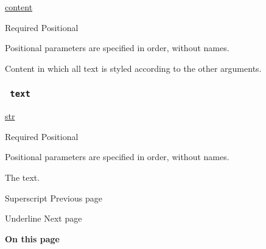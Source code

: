 \href{/docs/reference/foundations/content/}{content}

{Required} {{ Positional }}

\label{parameters-body-positional-tooltip}
Positional parameters are specified in order, without names.

Content in which all text is styled according to the other arguments.

\subsubsection{\texorpdfstring{\texttt{\ text\ }}{ text }}\label{parameters-text}

\href{/docs/reference/foundations/str/}{str}

{Required} {{ Positional }}

\label{parameters-text-positional-tooltip}
Positional parameters are specified in order, without names.

The text.

\href{/docs/reference/text/super/}{\pandocbounded{}}

{ Superscript } { Previous page }

\href{/docs/reference/text/underline/}{\pandocbounded{}}

{ Underline } { Next page }

\textbf{On this page}

